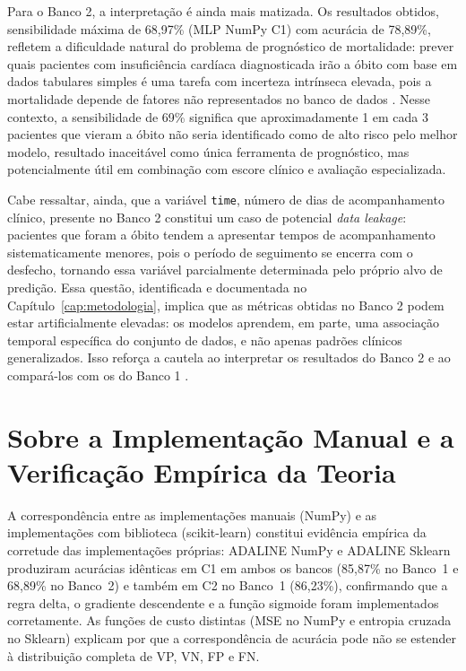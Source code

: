 Para o Banco 2, a interpreta\c c\~ao \'e ainda mais matizada. Os resultados obtidos, sensibilidade m\'axima de 68,97\% (MLP NumPy C1) com acur\'acia de 78,89\%, refletem a dificuldade natural do problema de progn\'ostico de mortalidade: prever quais pacientes com insufici\^encia card\'iaca diagnosticada ir\~ao a \'obito com base em dados tabulares simples \'e uma tarefa com incerteza intr\'inseca elevada, pois a mortalidade depende de fatores n\~ao representados no banco de dados \cite{chicco2020,rohde2018}. Nesse contexto, a sensibilidade de 69\% significa que aproximadamente 1 em cada 3 pacientes que vieram a \'obito n\~ao seria identificado como de alto risco pelo melhor modelo, resultado inaceit\'avel como \'unica ferramenta de progn\'ostico, mas potencialmente \'util em combina\c c\~ao com escore cl\'inico e avalia\c c\~ao especializada.

Cabe ressaltar, ainda, que a vari\'avel \texttt{time}, n\'umero de dias de acompanhamento cl\'inico, presente no Banco 2 constitui um caso de potencial \textit{data leakage}: pacientes que foram a \'obito tendem a apresentar tempos de acompanhamento sistematicamente menores, pois o per\'iodo de seguimento se encerra com o desfecho, tornando essa vari\'avel parcialmente determinada pelo pr\'oprio alvo de predi\c c\~ao. Essa quest\~ao, identificada e documentada no Cap\'itulo~\ref{cap:metodologia}, implica que as m\'etricas obtidas no Banco 2 podem estar artificialmente elevadas: os modelos aprendem, em parte, uma associa\c c\~ao temporal espec\'ifica do conjunto de dados, e n\~ao apenas padr\~oes cl\'inicos generalizados. Isso refor\c ca a cautela ao interpretar os resultados do Banco 2 e ao compar\'a-los com os do Banco 1 \cite{chicco2020}.

\section{Sobre a Implementa\c c\~ao Manual e a Verifica\c c\~ao Emp\'irica da Teoria}
\label{sec:implementacao_manual}

A correspond\^encia entre as implementa\c c\~oes manuais (NumPy) e as implementa\c c\~oes com biblioteca (scikit-learn) constitui evid\^encia emp\'irica da corretude das implementa\c c\~oes pr\'oprias: ADALINE NumPy e ADALINE Sklearn produziram acur\'acias id\^enticas em C1 em ambos os bancos (85,87\% no Banco~1 e 68,89\% no Banco~2) e tamb\'em em C2 no Banco~1 (86,23\%), confirmando que a regra delta, o gradiente descendente e a fun\c c\~ao sigmoide foram implementados corretamente. As fun\c c\~oes de custo distintas (MSE no NumPy e entropia cruzada no Sklearn) explicam por que a correspond\^encia de acur\'acia pode n\~ao se estender \`a distribui\c c\~ao completa de VP, VN, FP e FN.

